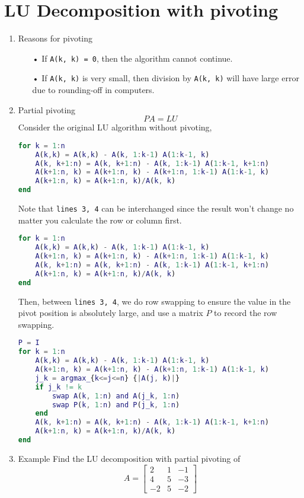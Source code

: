 \documentclass[11pt]{article}
\begin{document}
\section{LU Decomposition with pivoting}
\begin{enumerate}
\item{Reasons for pivoting}
\begin{itemize}
\item[•] If \texttt{A(k, k) = 0}, then the algorithm cannot continue.
\item[•] If \texttt{A(k, k)} is very small, then division by \texttt{A(k, k)} will have large error due to rounding-off in computers.
\end{itemize}
\item{Partial pivoting}
$$PA = LU$$
Consider the original LU algorithm without pivoting,
\begin{lstlisting}[language=matlab]
for k = 1:n
	A(k,k) = A(k,k) - A(k, 1:k-1) A(1:k-1, k)
	A(k, k+1:n) = A(k, k+1:n) - A(k, 1:k-1) A(1:k-1, k+1:n)
	A(k+1:n, k) = A(k+1:n, k) - A(k+1:n, 1:k-1) A(1:k-1, k)
	A(k+1:n, k) = A(k+1:n, k)/A(k, k)
end
\end{lstlisting}
Note that \texttt{lines 3, 4} can be interchanged since the result won't change no matter you calculate the row or column first.
\begin{lstlisting}[language=matlab]
for k = 1:n
	A(k,k) = A(k,k) - A(k, 1:k-1) A(1:k-1, k)
	A(k+1:n, k) = A(k+1:n, k) - A(k+1:n, 1:k-1) A(1:k-1, k)
	A(k, k+1:n) = A(k, k+1:n) - A(k, 1:k-1) A(1:k-1, k+1:n)
	A(k+1:n, k) = A(k+1:n, k)/A(k, k)
end
\end{lstlisting}
Then, between \texttt{lines 3, 4}, we do row swapping to ensure the value in the pivot position is absolutely large, and use a matrix $P$ to record the row swapping.
\begin{lstlisting}[language=matlab]
P = I
for k = 1:n
	A(k,k) = A(k,k) - A(k, 1:k-1) A(1:k-1, k)
	A(k+1:n, k) = A(k+1:n, k) - A(k+1:n, 1:k-1) A(1:k-1, k)
	j_k = argmax_{k<=j<=n} {|A(j, k)|}
	if j_k != k
		swap A(k, 1:n) and A(j_k, 1:n)
		swap P(k, 1:n) and P(j_k, 1:n)
	end
	A(k, k+1:n) = A(k, k+1:n) - A(k, 1:k-1) A(1:k-1, k+1:n)
	A(k+1:n, k) = A(k+1:n, k)/A(k, k)
end
\end{lstlisting}
\item{Example}
Find the LU decomposition with partial pivoting of $$A = \begin{bmatrix}
2 & 1 & -1\\
4 & 5 & -3\\
-2& 5 & -2
\end{bmatrix}$$

\end{enumerate}
\end{document}
